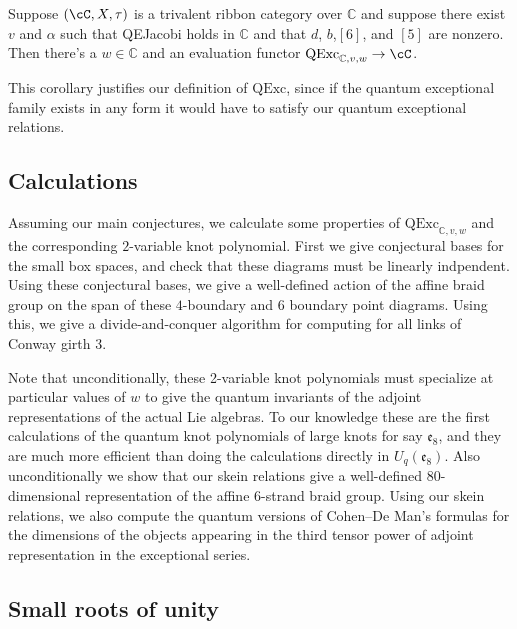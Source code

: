 \documentclass[12pt]{amsart}
\begin{document}
\begin{corollary}
Suppose $(\cC, X, \tau)$ is a trivalent ribbon category over $\mathbb{C}$ and suppose there exist $v$ and $\alpha$ such that QEJacobi holds in $\mathbb{C}$ and that $d$, $b$,$[6]$, and $[5]$ are nonzero.  Then there's a $w \in \mathbb{C}$ and an evaluation functor $\mathrm{QExc}_{\mathbb{C},v,w} \rightarrow \cC$.
\end{corollary}

This corollary justifies our definition of $\mathrm{QExc}$, since if the quantum exceptional family exists in any form it would have to satisfy our quantum exceptional relations.


\subsection{Calculations}


Assuming our main conjectures, we calculate some properties of $\mathrm{QExc}_{\mathbb{C},v,w}$ and the corresponding $2$-variable knot polynomial.  First we give conjectural bases for the small box spaces, and check that these diagrams must be linearly indpendent.  Using these conjectural bases, we give a well-defined action of the affine braid group on the span of these $4$-boundary and $6$ boundary point diagrams.  Using this, we give a divide-and-conquer algorithm for computing for all links of Conway girth 3.



Note that unconditionally, these 2-variable knot polynomials must specialize
at particular values of $w$ to give the quantum invariants of the adjoint
representations of the actual Lie algebras.  To our knowledge these are the
first calculations of the quantum knot polynomials of large knots for say
$\mathfrak{e}_8$, and they are much more efficient than doing the calculations
directly in $U_q(\mathfrak{e}_8)$.  Also unconditionally we show that our
skein relations give a well-defined $80$-dimensional representation of the
affine $6$-strand braid group.  Using our skein relations, we also compute the
quantum versions of Cohen--De Man's formulas for the dimensions of the objects
appearing in the third tensor power of adjoint representation in the
exceptional series.

\subsection{Small roots of unity}
\end{document}
